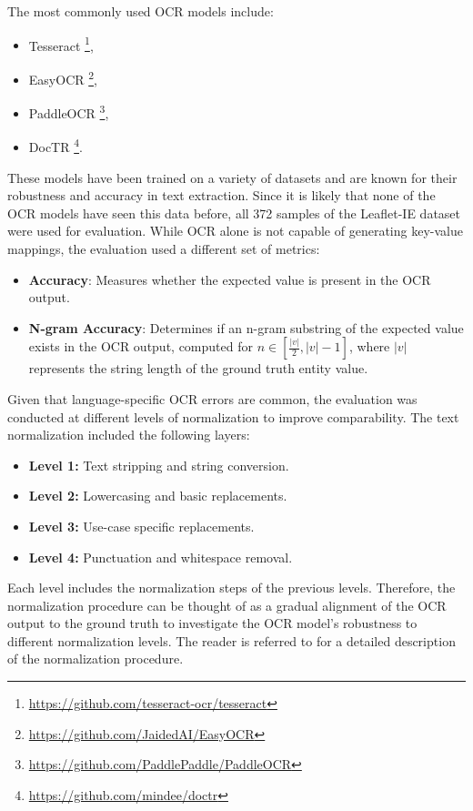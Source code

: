 \documentclass[11pt]{article}
\begin{document}
The most commonly used OCR models include:
\begin{itemize}
    \item Tesseract \footnote{\href{https://github.com/tesseract-ocr/tesseract}{https://github.com/tesseract-ocr/tesseract}},
    \item EasyOCR \footnote{\href{https://github.com/JaidedAI/EasyOCR}{https://github.com/JaidedAI/EasyOCR}},
    \item PaddleOCR \footnote{\href{https://github.com/PaddlePaddle/PaddleOCR}{https://github.com/PaddlePaddle/PaddleOCR}},
    \item DocTR \footnote{\href{https://github.com/mindee/doctr}{https://github.com/mindee/doctr}}.
\end{itemize}
These models have been trained on a variety of datasets and are known for their robustness and accuracy in text extraction. Since it is likely that none of the OCR models have seen this data before, all 372 samples of the Leaflet-IE dataset were used for evaluation. While OCR alone is not capable of generating key-value mappings, the evaluation used a different set of metrics:

\begin{itemize}
    \item \textbf{Accuracy}: Measures whether the expected value is present in the OCR output.
    \item \textbf{N-gram Accuracy}: Determines if an n-gram substring of the expected value exists in the OCR output, computed for $n \in \left[\frac{|v|}{2}, |v| - 1\right]$, where $|v|$ represents the string length of the ground truth entity value.
\end{itemize}

Given that language-specific OCR errors are common, the evaluation was conducted at different levels of normalization to improve comparability. The text normalization included the following layers:
\begin{itemize}
    \item \textbf{Level 1:} Text stripping and string conversion.
    \item \textbf{Level 2:} Lowercasing and basic replacements.
    \item \textbf{Level 3:} Use-case specific replacements.
    \item \textbf{Level 4:} Punctuation and whitespace removal.
\end{itemize}
Each level includes the normalization steps of the previous levels. Therefore, the normalization procedure can be thought of as a gradual alignment of the OCR output to the ground truth to investigate the OCR model's robustness to different normalization levels. The reader is referred to  for a detailed description of the normalization procedure.
\end{document}
